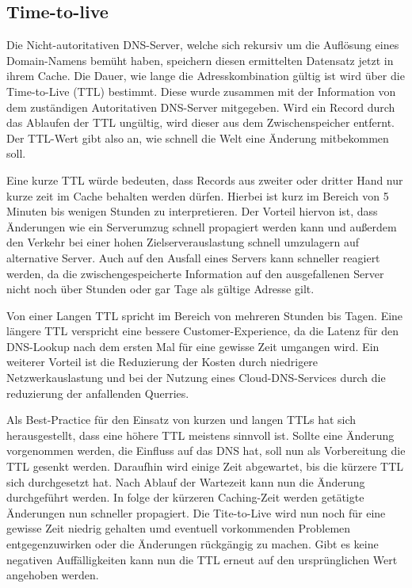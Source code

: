 \subsection{Time-to-live}
Die Nicht-autoritativen DNS-Server, welche sich rekursiv um die Auflösung eines Domain-Namens bemüht haben, speichern diesen ermittelten Datensatz jetzt in ihrem Cache. Die Dauer, wie lange die Adresskombination gültig ist wird über die Time-to-Live (TTL) bestimmt. Diese wurde zusammen mit der Information von dem zuständigen Autoritativen DNS-Server mitgegeben. Wird ein Record durch das Ablaufen der TTL ungültig, wird dieser aus dem Zwischenspeicher entfernt. Der TTL-Wert gibt also an, wie schnell die Welt eine Änderung mitbekommen soll. 

Eine kurze TTL würde bedeuten, dass Records aus zweiter oder dritter Hand nur kurze zeit im Cache behalten werden dürfen. Hierbei ist kurz im Bereich von 5 Minuten bis wenigen Stunden zu interpretieren. Der Vorteil hiervon ist, dass Änderungen wie ein Serverumzug schnell propagiert werden kann und außerdem den Verkehr bei einer hohen Zielserverauslastung schnell umzulagern auf alternative Server. Auch auf den Ausfall eines Servers kann schneller reagiert werden, da die zwischengespeicherte Information auf den ausgefallenen Server nicht noch über Stunden oder gar Tage als gültige Adresse gilt.

Von einer Langen TTL spricht im Bereich von mehreren Stunden bis Tagen. Eine längere TTL verspricht eine bessere Customer-Experience, da die Latenz für den DNS-Lookup nach dem ersten Mal für eine gewisse Zeit umgangen wird. Ein weiterer Vorteil ist die Reduzierung der Kosten durch niedrigere Netzwerkauslastung und bei der Nutzung eines Cloud-DNS-Services durch die reduzierung der anfallenden Querries.

Als Best-Practice für den Einsatz von kurzen und langen TTLs hat sich herausgestellt, dass eine höhere TTL meistens sinnvoll ist. Sollte eine Änderung vorgenommen werden, die Einfluss auf das DNS hat, soll nun als Vorbereitung die TTL gesenkt werden. Daraufhin wird einige Zeit abgewartet, bis die kürzere TTL sich durchgesetzt hat. Nach Ablauf der Wartezeit kann nun die Änderung durchgeführt werden. In folge der kürzeren Caching-Zeit werden getätigte Änderungen nun schneller propagiert. Die Tite-to-Live wird nun noch für eine gewisse Zeit niedrig gehalten umd eventuell vorkommenden Problemen entgegenzuwirken oder die Änderungen rückgängig zu machen. Gibt es keine negativen Auffälligkeiten kann nun die TTL erneut auf den ursprünglichen Wert angehoben werden.

